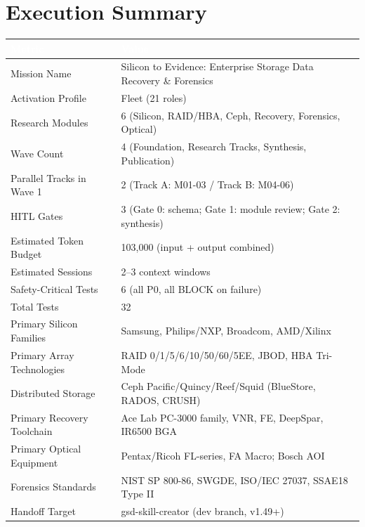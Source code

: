 \documentclass[11pt,letterpaper]{article}
\newcommand{\tableheader}[1]{\textbf{\sffamily\textcolor{white}{#1}}}
\begin{document}
\section{Execution Summary}

\begin{center}
\begin{tabularx}{\textwidth}{L{4cm}X}
\toprule
{}
\tableheader{Metric} & \tableheader{Value} \\
\midrule
Mission Name & Silicon to Evidence: Enterprise Storage Data Recovery \& Forensics \\
Activation Profile & Fleet (21 roles) \\
Research Modules & 6 (Silicon, RAID/HBA, Ceph, Recovery, Forensics, Optical) \\
Wave Count & 4 (Foundation, Research Tracks, Synthesis, Publication) \\
Parallel Tracks in Wave 1 & 2 (Track A: M01-03 / Track B: M04-06) \\
HITL Gates & 3 (Gate 0: schema; Gate 1: module review; Gate 2: synthesis) \\
Estimated Token Budget & 103,000 (input + output combined) \\
Estimated Sessions & 2--3 context windows \\
Safety-Critical Tests & 6 (all P0, all BLOCK on failure) \\
Total Tests & 32 \\
Primary Silicon Families & Samsung, Philips/NXP, Broadcom, AMD/Xilinx \\
Primary Array Technologies & RAID 0/1/5/6/10/50/60/5EE, JBOD, HBA Tri-Mode \\
Distributed Storage & Ceph Pacific/Quincy/Reef/Squid (BlueStore, RADOS, CRUSH) \\
Primary Recovery Toolchain & Ace Lab PC-3000 family, VNR, FE, DeepSpar, IR6500 BGA \\
Primary Optical Equipment & Pentax/Ricoh FL-series, FA Macro; Bosch AOI \\
Forensics Standards & NIST SP 800-86, SWGDE, ISO/IEC 27037, SSAE18 Type II \\
Handoff Target & gsd-skill-creator (dev branch, v1.49+) \\
\bottomrule
\end{tabularx}
\end{center}

\vspace{2em}
\end{document}
